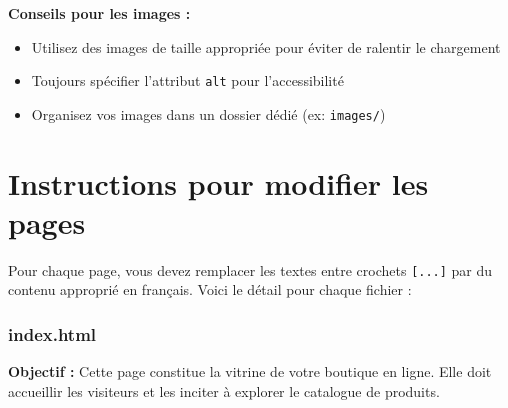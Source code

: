 \documentclass[12pt,a4paper]{article}
\begin{document}
\textbf{Conseils pour les images :}
\begin{itemize}
\item Utilisez des images de taille appropriée pour éviter de ralentir le chargement
\item Toujours spécifier l'attribut \texttt{alt} pour l'accessibilité
\item Organisez vos images dans un dossier dédié (ex: \texttt{images/})
\end{itemize}

\section{Instructions pour modifier les pages}

Pour chaque page, vous devez remplacer les textes entre crochets \texttt{[...]} par du contenu approprié en français. Voici le détail pour chaque fichier :

\subsubsection{index.html}

\textbf{Objectif :} Cette page constitue la vitrine de votre boutique en ligne. Elle doit accueillir les visiteurs et les inciter à explorer le catalogue de produits.
\end{document}
